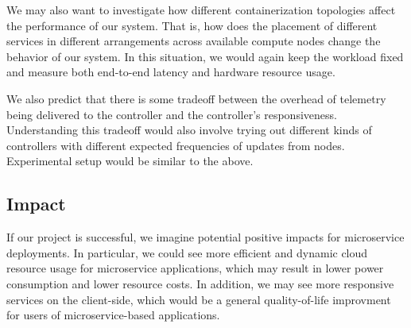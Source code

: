 \documentclass{proposal}
\begin{document}
We may also want to investigate how different containerization topologies affect the performance of our system. That is, how does the placement of different services in different arrangements across available compute nodes change the behavior of our system. In this situation, we would again keep the workload fixed and measure both end-to-end latency and hardware resource usage.

We also predict that there is some tradeoff between the overhead of telemetry being delivered to the controller and the controller's responsiveness. Understanding this tradeoff would also involve trying out different kinds of controllers with different expected frequencies of updates from nodes. Experimental setup would be similar to the above. 

\subsection{Impact}
If our project is successful, we imagine potential positive impacts for microservice deployments. In particular, we could see more efficient and dynamic cloud resource usage for microservice applications, which may result in lower power consumption and lower resource costs. In addition, we may see more responsive services on the client-side, which would be a general quality-of-life improvment for users of microservice-based applications.

 
\begin{small}

\end{small}
\end{document}
